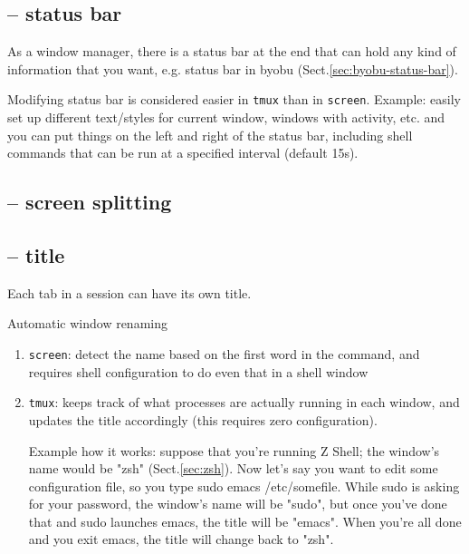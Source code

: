 \subsection{-- status bar}
\label{sec:terminal_multiplexer-status-bar}

As a window manager, there is a status bar at the end that can hold any kind of
information that you want, e.g. status bar in byobu
(Sect.\ref{sec:byobu-status-bar}).

Modifying status bar is considered easier in \verb!tmux! than in \verb!screen!. 
Example: easily set up different text/styles for current window, windows with
activity, etc. and you can put things on the left and right of the status bar,
including shell commands that can be run at a specified interval (default 15s). 

\subsection{-- screen splitting}
\label{sec:screen-spliting}



\subsection{-- title}
\label{sec:terminal_multiplexer-title}

Each tab in a session can have its own title. 

Automatic window renaming
\begin{enumerate}
  \item \verb!screen!: detect the name based on the first word in the command, 
  and requires shell configuration to do even that in a shell window
  
  \item \verb!tmux!: keeps track of what processes are actually running in each
  window, and updates the title accordingly (this requires zero configuration). 
  
Example how it works:
suppose that you're running Z Shell; the window's name would be "zsh"
(Sect.\ref{sec:zsh}). Now let's say you want to edit some configuration file, so
you type sudo emacs /etc/somefile. While sudo is asking for your password, the
window's name will be "sudo", but once you've done that and sudo launches emacs,
the title will be "emacs". When you're all done and you exit emacs, the title
will change back to "zsh".



\end{enumerate}


